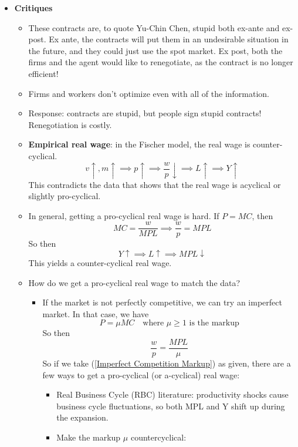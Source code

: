 \documentclass[12pt]{article}
\begin{document}
\begin{itemize}
    \item \textbf{Critiques}
    \begin{itemize}
        \item These contracts are, to quote Yu-Chin Chen, stupid both ex-ante and ex-post. Ex ante, the contracts will put them in an undesirable situation in the future, and they could just use the spot market. Ex post, both the firms and the agent would like to renegotiate, as the contract is no longer efficient!
        \item Firms and workers don't optimize even with all of the information.
        \item Response: contracts are stupid, but people sign stupid contracts! Renegotiation is costly. 
        \item \textbf{Empirical real wage}: in the Fischer model, the real wage is counter-cyclical. 
        \[v \uparrow, m \uparrow \implies p \uparrow \implies \frac{w}{p} \downarrow \implies L \uparrow \implies Y \uparrow \]
        This contradicts the data that shows that the real wage is acyclical or slightly pro-cyclical. 
        \item In general, getting a pro-cyclical real wage is hard. If $P=MC$, then 
        \[MC = \frac{w}{MPL} \implies \frac{w}{p} = MPL\]
        So then 
        \[Y \uparrow \implies L\uparrow \implies MPL \downarrow\]
        This yields a counter-cyclical real wage.
        \item How do we get a pro-cyclical real wage to match the data?
        \begin{itemize}
            \item If the market is not perfectly competitive, we can try an imperfect market. In that case, we have
            \[P = \mu MC \quad \text{where $\mu \geq 1$ is the markup}\]
            So then
            \begin{equation}\label{Imperfect Competition Markup}
                \frac{w}{p} = \frac{MPL}{\mu}
            \end{equation}
            So if we take (\ref{Imperfect Competition Markup}) as given, there are a few ways to get a pro-cyclical (or a-cyclical) real wage:
            \begin{itemize}
                \item Real Business Cycle (RBC) literature: productivity shocks cause business cycle fluctuations, so both MPL and Y shift up during the expansion.
                \item Make the markup $\mu$ countercyclical:

\end{itemize}
\end{itemize}
\end{itemize}
\end{itemize}
\end{document}
